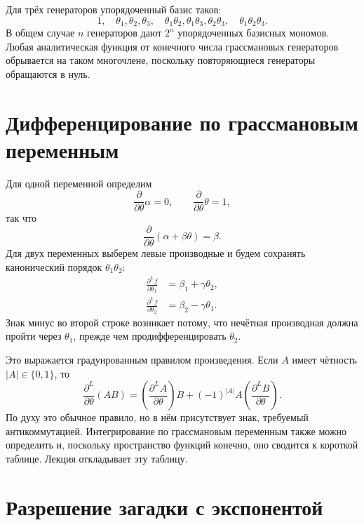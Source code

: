 Для трёх генераторов упорядоченный базис таков:
\begin{equation}
1,\quad
\theta_1,\theta_2,\theta_3,\quad
\theta_1\theta_2,\theta_1\theta_3,\theta_2\theta_3,\quad
\theta_1\theta_2\theta_3.
\end{equation}
В общем случае \(n\) генераторов дают \(2^n\) упорядоченных базисных мономов. Любая аналитическая функция от конечного числа грассмановых генераторов обрывается на таком многочлене, поскольку повторяющиеся генераторы обращаются в нуль. 

\section{Дифференцирование по грассмановым переменным}

Для одной переменной определим
\begin{equation}
\frac{\partial}{\partial\theta}\alpha=0,
\qquad
\frac{\partial}{\partial\theta}\theta=1,
\end{equation}
так что
\begin{equation}
\frac{\partial}{\partial\theta}
(\alpha+\beta\theta)=\beta.
\end{equation}
Для двух переменных выберем левые производные и будем сохранять канонический порядок \(\theta_1\theta_2\):
\begin{align}
\frac{\partial^L f}{\partial\theta_1}
&=\beta_1+\gamma\theta_2,\\
\frac{\partial^L f}{\partial\theta_2}
&=\beta_2-\gamma\theta_1.
\end{align}
Знак минус во второй строке возникает потому, что нечётная производная должна пройти через \(\theta_1\), прежде чем продифференцировать \(\theta_2\).

Это выражается градуированным правилом произведения. Если \(A\) имеет чётность \(|A|\in\{0,1\}\), то
\begin{equation}
\frac{\partial^L}{\partial\theta}(AB)
=\left(\frac{\partial^L A}{\partial\theta}\right)B
+(-1)^{|A|}A
\left(\frac{\partial^L B}{\partial\theta}\right).
\end{equation}
По духу это обычное правило, но в нём присутствует знак, требуемый антикоммутацией. Интегрирование по грассмановым переменным также можно определить и, поскольку пространство функций конечно, оно сводится к короткой таблице. Лекция откладывает эту таблицу.

\section{Разрешение загадки с экспонентой}

